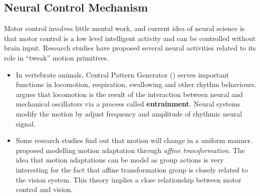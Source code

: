 \subsection{ Neural Control Mechanism}
Motor control involves little mental work,
and current idea of neural science is that motor control is a low level intelligent activity and can be controlled  without brain input. 
Research studies have proposed several neural activities related to its role in ``tweak''  motion primitives.
\begin{itemize}
\item
In vertebrate animals,  Central Pattern Generator (\cpg) serves important functions in locomotion, respiration, swallowing and other rhythm behaviours.
\citet{Cohen1988a} argues that locomotion is the result of the interaction between neural and mechanical oscillators via a process called \textbf{entrainment}.
Neural systems modify the motion by adjust frequency and amplitude of  rhythmic neural signal.



\item
Some research studies find out that motion will change in a uniform manner\citep{Viviani1992}.\citet{flash2007affine} proposed modelling motion adaptation through \emph{affine transformation}.
The idea that motion adaptations can be model as group actions is very interesting for the fact that affine transformation group is closely related to the vision system.
This theory implies a close relationship between motor control and vision.

\end{itemize}









